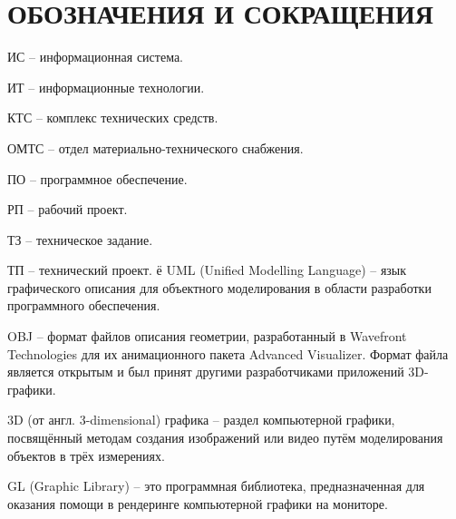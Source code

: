 \section*{ОБОЗНАЧЕНИЯ И СОКРАЩЕНИЯ}

ИС -- информационная система.

ИТ -- информационные технологии. 

КТС -- комплекс технических средств.

ОМТС -- отдел материально-технического снабжения. 

ПО -- программное обеспечение.

РП -- рабочий проект.

ТЗ -- техническое задание.

ТП -- технический проект.
ё
UML (Unified Modelling Language) -- язык графического описания для объектного моделирования в области разработки программного обеспечения.

OBJ -- формат файлов описания геометрии, разработанный в Wavefront Technologies для их анимационного пакета Advanced Visualizer. Формат файла является открытым и был принят другими разработчиками приложений 3D-графики.

3D (от англ. 3-dimensional) графика -- раздел компьютерной графики, посвящённый методам создания изображений или видео путём моделирования объектов в трёх измерениях.

GL (Graphic Library) -- это программная библиотека, предназначенная для оказания помощи в рендеринге компьютерной графики на мониторе.
